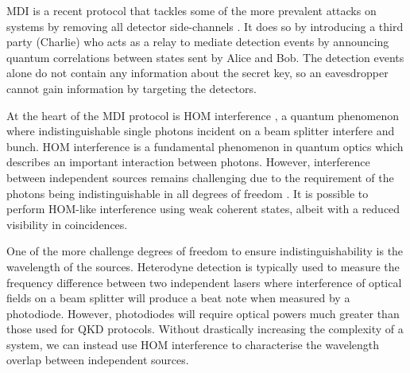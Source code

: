 \Ac{MDI} is a recent protocol that tackles some of the more prevalent attacks on systems by removing all detector side-channels \cite{mdi-qkd}. It does so by introducing a third party (Charlie) who acts as a relay to mediate detection events by announcing quantum correlations between states sent by Alice and Bob. The detection events alone do not contain any information about the secret key, so an eavesdropper cannot gain information by targeting the detectors. 

At the heart of the \Ac{MDI} protocol is \ac{HOM} interference \cite{HOM}, a quantum phenomenon where indistinguishable single photons incident on a beam splitter interfere and bunch. \ac{HOM} interference is a fundamental phenomenon in quantum optics which describes an important interaction between photons. However, interference between independent sources remains challenging due to the requirement of the photons being indistinguishable in all degrees of freedom \cite{Xu2013}. It is possible to perform \ac{HOM}-like interference using weak coherent states, albeit with a reduced visibility in coincidences. 

One of the more challenge degrees of freedom to ensure indistinguishability is the wavelength of the sources. Heterodyne detection is typically used to measure the frequency difference between two independent lasers where interference of optical fields on a beam splitter will produce a beat note when measured by a photodiode. However, photodiodes will require optical powers much greater than those used for \ac{QKD} protocols. Without drastically increasing the complexity of a system, we can instead use \ac{HOM} interference to characterise the wavelength overlap between independent sources.




